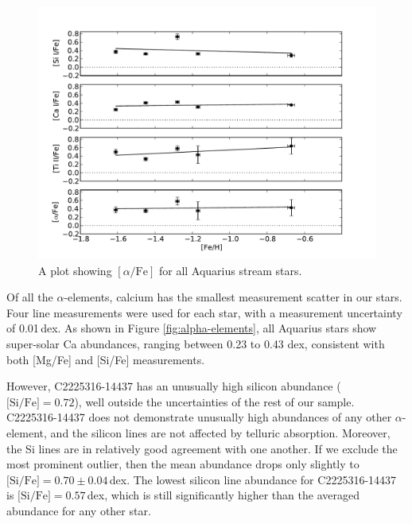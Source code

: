 \documentclass{emulateapj}
\begin{document}
\begin{figure}[h]
	\includegraphics[width=\columnwidth]{./figures/aquarius-alpha-fe.pdf}
	\caption{A plot showing $[\alpha/\mbox{Fe}]$ for all Aquarius stream stars.}
	\label{fig:alpha-fe}
\end{figure}

Of all the $\alpha$-elements, calcium has the smallest measurement scatter in our stars. Four line measurements were used for each star, with a measurement uncertainty of 0.01\,dex. As shown in Figure \ref{fig:alpha-elements}, all Aquarius stars show super-solar Ca abundances, ranging between 0.23 to 0.43 dex, consistent with both [Mg/Fe] and [Si/Fe] measurements. 

However, C2225316-14437 has an unusually high silicon abundance ($\mbox{[Si/Fe]} = 0.72$), well outside the uncertainties of the rest of our sample. C2225316-14437 does not demonstrate unusually high abundances of any other $\alpha$-element, and the silicon lines are not affected by telluric absorption. Moreover, the Si lines are in relatively good agreement with one another. If we exclude the most prominent outlier, then the mean abundance drops only slightly to $\mbox{[Si/Fe]} = 0.70 \pm 0.04$\,dex. The lowest silicon line abundance for C2225316-14437 is $\mbox{[Si/Fe]} = 0.57$\,dex, which is still significantly higher than the averaged abundance for any other star.

\end{document}
